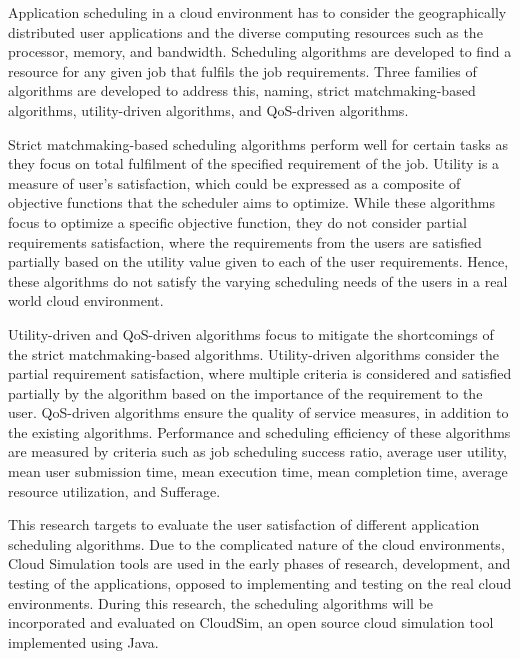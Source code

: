 \documentclass[times, 10pt,twocolumn]{article}
\begin{document}
Application scheduling in a cloud environment has to consider the geographically distributed user applications and the diverse computing resources such as the processor, memory, and bandwidth. Scheduling algorithms are developed to find a resource for any given job that fulfils the job requirements. Three families of algorithms are developed to address this, naming, strict matchmaking-based algorithms, utility-driven algorithms, and QoS-driven algorithms.

Strict matchmaking-based scheduling algorithms perform well for certain tasks as they focus on total fulfilment of the specified requirement of the job. Utility is a measure of user's satisfaction, which could be expressed as a composite of objective functions that the scheduler aims to optimize. While these algorithms focus to optimize a specific objective function, they do not consider partial requirements satisfaction, where the requirements from the users are satisfied partially based on the utility value given to each of the user requirements\cite{resumo}. Hence, these algorithms do not satisfy the varying scheduling needs of the users in a real world cloud environment.

Utility-driven and QoS-driven algorithms focus to mitigate the shortcomings of the strict matchmaking-based algorithms. Utility-driven algorithms consider the partial requirement satisfaction, where multiple criteria is considered and satisfied partially by the algorithm based on the importance of the requirement to the user. QoS-driven algorithms ensure the quality of service measures, in addition to the existing algorithms. Performance and scheduling efficiency of these algorithms are measured by criteria such as job scheduling success ratio, average user utility, mean user submission time, mean execution time, mean completion time, average resource utilization, and Sufferage.

This research targets to evaluate the user satisfaction of different application scheduling algorithms. Due to the complicated nature of the cloud environments, Cloud Simulation tools are used in the early phases of research, development, and testing of the applications, opposed to implementing and testing on the real cloud environments. During this research, the scheduling algorithms will be incorporated and evaluated on CloudSim\cite{cloudsim}, an open source cloud simulation tool implemented using Java. 
\end{document}
